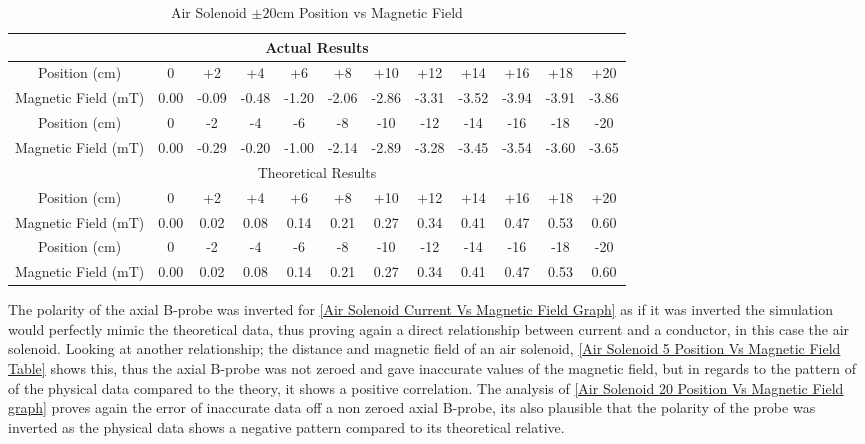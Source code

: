 \documentclass[12pt]{article}
\begin{document}
\begin{table}[H]
\begin{center}
 \footnotesize
 \begin{tabular}{|c||c|c|c|c|c|c|c|c|c|c|c|}
 \hline
 \multicolumn{12}{|c|}{Actual Results} \\
 \hline
 Position (cm) & 0 & +2 & +4 & +6 & +8 & +10 & +12 & +14 & +16 & +18 & +20 \\
 \hline
 Magnetic Field (mT) & 0.00 & -0.09 & -0.48 & -1.20 & -2.06 & -2.86 & -3.31 & -3.52 & -3.94 & -3.91 & -3.86 \\
 \hline \hline
 Position (cm) & 0 & -2 & -4 & -6 & -8 & -10 & -12 & -14 & -16 & -18 & -20 \\
 \hline
 Magnetic Field (mT) & 0.00 & -0.29 & -0.20 & -1.00 & -2.14 & -2.89 & -3.28 & -3.45 & -3.54 & -3.60 & -3.65 \\
 \hline
 \hline
 \multicolumn{12}{|c|}{Theoretical Results} \\
 \hline
 Position (cm) & 0 & +2 & +4 & +6 & +8 & +10 & +12 & +14 & +16 & +18 & +20 \\
 \hline
 Magnetic Field (mT) & 0.00 & 0.02 & 0.08 & 0.14 & 0.21 & 0.27 & 0.34 & 0.41 & 0.47 & 0.53 & 0.60 \\
 \hline \hline
 Position (cm) & 0 & -2 & -4 & -6 & -8 & -10 & -12 & -14 & -16 & -18 & -20 \\
 \hline
 Magnetic Field (mT) & 0.00 & 0.02 & 0.08 & 0.14 & 0.21 & 0.27 & 0.34 & 0.41 & 0.47 & 0.53 & 0.60 \\
 \hline
 \end{tabular}
 \caption{Air Solenoid $\pm20$cm Position vs Magnetic Field}
 \label{Air Solenoid 20 Postion Vs Magnetic Field Table}
\end{center}
\end{table}

The polarity of the axial B-probe was inverted for \cref{Air Solenoid Current Vs Magnetic Field Graph} as if it was inverted the simulation would perfectly mimic the theoretical data, thus proving again a direct relationship between current and a conductor, in this case the air solenoid. Looking at another relationship; the distance and magnetic field of an air solenoid, \cref{Air Solenoid 5 Position Vs Magnetic Field Table} shows this, thus the axial B-probe was not zeroed and gave inaccurate values of the magnetic field, but in regards to the pattern of of the physical data compared to the theory, it shows a positive correlation. The analysis of \cref{Air Solenoid 20 Position Vs Magnetic Field graph} proves again the error of inaccurate data off a non zeroed axial B-probe, its also plausible that the polarity of the probe was inverted as the physical data shows a negative pattern compared to its theoretical relative. \\
\end{document}
